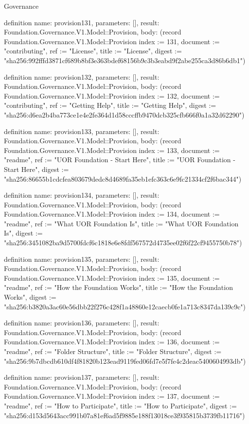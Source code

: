 \begin{lexlean}{Governance}
\begin{semanticmodule}
definition{
  name: provision131,
  parameters: [],
  result: Foundation.Governance.V1.Model::Provision,
  body: (record Foundation.Governance.V1.Model::Provision {index := 131, document := "contributing", ref := "License", title := "License", digest := "sha256:992fffd3871cf689b8bf3e363bdef68156b9c3b3eabd9f2abe255ca3d86b6db1"})
}

definition{
  name: provision132,
  parameters: [],
  result: Foundation.Governance.V1.Model::Provision,
  body: (record Foundation.Governance.V1.Model::Provision {index := 132, document := "contributing", ref := "Getting Help", title := "Getting Help", digest := "sha256:d6ea2b4ba773ce1e4e2fe364d1d58cccffb9470dcb325cfb666f0a1a32d62290"})
}

definition{
  name: provision133,
  parameters: [],
  result: Foundation.Governance.V1.Model::Provision,
  body: (record Foundation.Governance.V1.Model::Provision {index := 133, document := "readme", ref := "UOR Foundation - Start Here", title := "UOR Foundation - Start Here", digest := "sha256:86655b1cdcfea803679dedc8d4689fa35eb1efc363c6e9fc21334cf2f6bac344"})
}

definition{
  name: provision134,
  parameters: [],
  result: Foundation.Governance.V1.Model::Provision,
  body: (record Foundation.Governance.V1.Model::Provision {index := 134, document := "readme", ref := "What UOR Foundation Is", title := "What UOR Foundation Is", digest := "sha256:3451082ba9d5700fdcf6c1818e6e8fdf567572d4735ee02f6f22cf9455750b78"})
}

definition{
  name: provision135,
  parameters: [],
  result: Foundation.Governance.V1.Model::Provision,
  body: (record Foundation.Governance.V1.Model::Provision {index := 135, document := "readme", ref := "How the Foundation Works", title := "How the Foundation Works", digest := "sha256:b3820a3ac60e56dbb22f276c428f1a48860e12caecb0fe1a713c8347da139c9c"})
}

definition{
  name: provision136,
  parameters: [],
  result: Foundation.Governance.V1.Model::Provision,
  body: (record Foundation.Governance.V1.Model::Provision {index := 136, document := "readme", ref := "Folder Structure", title := "Folder Structure", digest := "sha256:9b7dbcdb610df4f81820b123ead9119fed06fd7e5f7fe4c2deac5400604993db"})
}

definition{
  name: provision137,
  parameters: [],
  result: Foundation.Governance.V1.Model::Provision,
  body: (record Foundation.Governance.V1.Model::Provision {index := 137, document := "readme", ref := "How to Participate", title := "How to Participate", digest := "sha256:d153d5643acc991b07a81ef6ad5f9885e188f13018ce3f935815b3739fb11716"})
}


\end{semanticmodule}
\end{lexlean}
